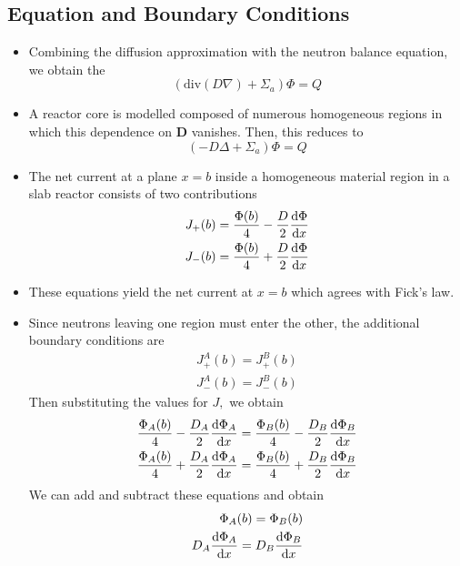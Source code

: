 \documentclass[a4paper]{article}
\begin{document}
\subsection{Equation and Boundary Conditions}
\begin{itemize}
    \item Combining the diffusion approximation with the neutron balance equation, we obtain the  \begin{equation}
        (\mathrm{div}(D\nabla)+\Sigma_a)\Phi=Q
    \end{equation}
    \item A reactor core is modelled composed of numerous homogeneous regions in which this dependence on $\mathbf D$ vanishes. Then, this reduces to \begin{equation}
        (-D\Delta+\Sigma_a)\Phi=Q
    \end{equation}
    \item The net current at a plane $x=b$ inside a homogeneous material region in a slab reactor consists of two contributions\begin{align}
        J_+(b)&=\frac{\Phi(b)}{4}-\frac{D}{2}\derivative{\Phi}{x}(b)\\
        J_-(b)&=\frac{\Phi(b)}{4}+\frac{D}{2}\derivative{\Phi}{x}(b)
    \end{align}
    \item These equations yield the net current at $x=b$ which agrees with Fick's law.
    \item Since neutrons leaving one region must enter the other, the additional boundary conditions are\begin{align}
        J_+^A(b)=J_+^B(b)\\
        J_-^A(b)=J_-^B(b)
    \end{align}
    Then substituting the values for $J,$ we obtain \begin{align}
        \frac{\Phi_A(b)}{4}-\frac{D_A}{2}\derivative{\Phi_A}{x}(b)=\frac{\Phi_B(b)}{4}-\frac{D_B}{2}\derivative{\Phi_B}{x}(b)\\
        \frac{\Phi_A(b)}{4}+\frac{D_A}{2}\derivative{\Phi_A}{x}(b)=\frac{\Phi_B(b)}{4}+\frac{D_B}{2}\derivative{\Phi_B}{x}(b)
    \end{align}
    We can add and subtract these equations and obtain \begin{align}
        \Phi_A(b)=\Phi_B(b)\\
        D_A\derivative{\Phi_A}{x}(b)=D_B\derivative{\Phi_B}{x}(b)
    \end{align}

\end{itemize}
\end{document}
